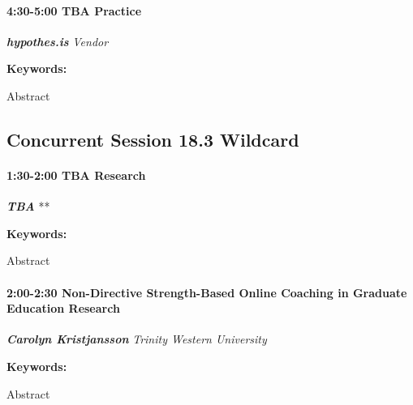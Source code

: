 \documentclass[
]{book}
\begin{document}
\begin{session}
\hypertarget{tba-practice}{%
\paragraph*{\texorpdfstring{4:30-5:00 \textbar{} \textbf{TBA} \textbar{}
Practice}{4:30-5:00 \textbar{} TBA \textbar{} Practice}}\label{tba-practice}}

\textbf{\emph{hypothes.is}} \textbar{} \emph{Vendor}

\textbf{Keywords:}

Abstract
\end{session}

\hypertarget{concurrent-session-18.3-wildcard}{%
\subsection*{Concurrent Session 18.3 \textbar{} Wildcard}\label{concurrent-session-18.3-wildcard}}

\begin{session}
\hypertarget{tba-research}{%
\paragraph*{\texorpdfstring{1:30-2:00 \textbar{} \textbf{TBA} \textbar{}
Research}{1:30-2:00 \textbar{} TBA \textbar{} Research}}\label{tba-research}}

\textbf{\emph{TBA}} \textbar{} **

\textbf{Keywords:}

Abstract
\end{session}

\begin{session}
\hypertarget{non-directive-strength-based-online-coaching-in-graduate-education-research}{%
\paragraph*{\texorpdfstring{2:00-2:30 \textbar{} \textbf{Non-Directive
Strength-Based Online Coaching in Graduate Education} \textbar{}
Research}{2:00-2:30 \textbar{} Non-Directive Strength-Based Online Coaching in Graduate Education \textbar{} Research}}\label{non-directive-strength-based-online-coaching-in-graduate-education-research}}

\textbf{\emph{Carolyn Kristjansson}} \textbar{} \emph{Trinity Western
University}

\textbf{Keywords:}

Abstract
\end{session}
\end{document}
